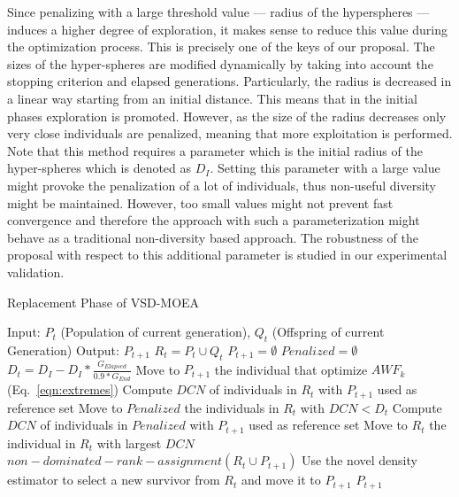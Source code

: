 Since penalizing with a large threshold value --- radius of the hyperspheres --- induces a higher degree of 
exploration, it makes sense to reduce this value during the optimization process.
%
This is precisely one of the keys of our proposal.
%
The sizes of the hyper-spheres are modified dynamically by taking into account the stopping 
criterion and elapsed generations.
%
Particularly, the radius is decreased in a linear way starting from an initial distance.
%
This means that in the initial phases exploration is promoted.
%
However, as the size of the radius decreases only very close individuals are penalized, meaning that more 
exploitation is performed.
%
Note that this method requires a parameter which is the initial radius of the hyper-spheres which is denoted as $D_I$. 
%
Setting this parameter with a large value might provoke the penalization of a lot of individuals, 
thus non-useful diversity might be maintained.
%
However, too small values might not prevent fast convergence and therefore the approach with such a parameterization 
might behave as a traditional non-diversity based approach.
%
The robustness of the proposal with respect to this additional parameter is studied in our experimental validation.

\begin{algorithm}[t]
  \scriptsize
	\caption{Replacement Phase of VSD-MOEA} 
\begin{algorithmic}[1]
\STATE Input: $P_t$ (Population of current generation), $Q_t$ (Offspring of current Generation)
    	\STATE Output: $P_{t+1}$ 
        \STATE $R_t = P_t \cup Q_t$ \label{alg:1}
        \STATE $P_{t+1} = \emptyset$ \label{alg:2}
        \STATE $Penalized = \emptyset$ \label{alg:3}
				\STATE $D_t = D_I - D_I * \frac{G_{Elapsed}}{0.9*G_{End}}$ \label{alg:4}
					\STATE Move to $P_{t+1}$ the individual that optimize $AWF_k$ (Eq.~\ref{eqn:extremes}) \label{alg:5}
				\ENDFOR
         \label{alg:6}
					\STATE Compute $DCN$ of individuals in $R_t$ with $P_{t+1}$ used as reference set \label{alg:7}
					\STATE Move to $Penalized$ the individuals in $R_t$ with $DCN < D_t$  \label{alg:8}
        	 \label{alg:9}
						\STATE Compute $DCN$ of individuals in $Penalized$ with $P_{t+1}$ used as reference set \label{alg:10}
						\STATE Move to $R_t$ the individual in $R_t$ with largest $DCN$ \label{alg:11}
        	\ENDIF
					\STATE $non-dominated-rank-assignment(R_t \cup P_{t+1}) $ \label{alg:12}
					\STATE Use the novel density estimator to select a new survivor from $R_t$ and move it to $P_{t+1}$\label{alg:13}
        \ENDWHILE
    	\RETURN $P_{t+1}$ \label{alg:14}
	\end{algorithmic}
\label{alg:Replacement_Phase}
\end{algorithm}


